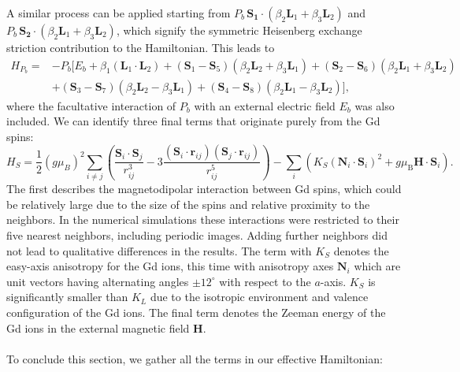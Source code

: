A similar process can be applied starting from $P_b \, \bm{S_1}\cdot(\beta_2 \bm{L}_1 + \beta_3 \bm{L}_2)$ and $P_b\, \bm{S_2}\cdot(\beta_2 \bm{L}_1 + \beta_3 \bm{L}_2)$, which signify the symmetric Heisenberg exchange striction contribution to the Hamiltonian. This leads to
\begin{align}
	H_{P_b}=&-P_b[E_b + \beta_1 (\bm{L}_1\cdot \bm{L}_2)+
    (\bm{S}_1-\bm{S}_5)(\beta_2 \bm{L}_2 + \beta_3 \bm{L}_1) +
    (\bm{S}_2-\bm{S}_6)(\beta_2 \bm{L}_1 + \beta_3 \bm{L}_2) \nonumber\\ 
    &+(\bm{S}_3-\bm{S}_7)(\beta_2 \bm{L}_2 - \beta_3 \bm{L}_1) +
    (\bm{S}_4-\bm{S}_8)(\beta_2 \bm{L}_1 - \beta_3 \bm{L}_2)],
\end{align}
where the facultative interaction of $P_b$ with an external electric field $E_b$ was also included. 
We can identify three final terms that originate purely from the Gd spins:
\begin{equation}
     H_S=\frac{1}{2}(g \mu_B)^2\sum_{i\neq j}\left(\frac{\bm{S}_i\cdot \bm{S}_j}{r_{ij}^3}-3\frac{(\bm{S}_i\cdot \bm{r}_{ij})(\bm{S}_j\cdot \bm{r}_{ij})}{r_{ij}^5}\right) - \sum_i\left( K_S(\bm{N}_i\cdot \bm{S}_i)^2 + g\mu_\mathrm{B} \bm{H} \cdot \bm{S}_i\right). 
\end{equation}
The first describes the magnetodipolar interaction between Gd spins, which could be relatively large due to the size of the spins and relative proximity to the neighbors.
In the numerical simulations these interactions were restricted to their five nearest neighbors, including periodic images.
Adding further neighbors did not lead to qualitative differences in the results.
The term with $K_S$ denotes the easy-axis anisotropy for the Gd ions, this time with anisotropy axes $\bm{N}_i$ which are unit vectors having alternating angles $\pm 12^\circ$ with respect to the $a$-axis.
$K_S$ is significantly smaller than $K_L$ due to the isotropic environment and valence configuration of the Gd ions.
The final term denotes the Zeeman energy of the Gd ions in the external magnetic field $\bm{H}$.
\\\\
To conclude this section, we gather all the terms in our effective Hamiltonian:
